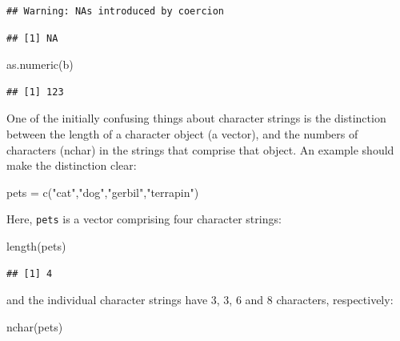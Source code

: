 \documentclass[
]{book}
\newenvironment{Shaded}{\begin{snugshade}}{\end{snugshade}}
\newcommand{\FunctionTok}[1]{\textcolor[rgb]{0.00,0.00,0.00}{#1}}
\newcommand{\NormalTok}[1]{#1}
\newcommand{\OtherTok}[1]{\textcolor[rgb]{0.56,0.35,0.01}{#1}}
\newcommand{\StringTok}[1]{\textcolor[rgb]{0.31,0.60,0.02}{#1}}
\begin{document}
\begin{verbatim}
## Warning: NAs introduced by coercion
\end{verbatim}

\begin{verbatim}
## [1] NA
\end{verbatim}

\begin{Shaded}
\begin{Highlighting}[]
\FunctionTok{as.numeric}\NormalTok{(b)}
\end{Highlighting}
\end{Shaded}

\begin{verbatim}
## [1] 123
\end{verbatim}

One of the initially confusing things about character strings is the distinction between the length of a character object (a vector), and the numbers of characters (nchar) in the strings that comprise that object.
An example should make the distinction clear:

\begin{Shaded}
\begin{Highlighting}[]
\NormalTok{pets }\OtherTok{=} \FunctionTok{c}\NormalTok{(}\StringTok{"cat"}\NormalTok{,}\StringTok{"dog"}\NormalTok{,}\StringTok{"gerbil"}\NormalTok{,}\StringTok{"terrapin"}\NormalTok{)}
\end{Highlighting}
\end{Shaded}

Here, \texttt{pets} is a vector comprising four character strings:

\begin{Shaded}
\begin{Highlighting}[]
\FunctionTok{length}\NormalTok{(pets)}
\end{Highlighting}
\end{Shaded}

\begin{verbatim}
## [1] 4
\end{verbatim}

and the individual character strings have 3, 3, 6 and 8 characters, respectively:

\begin{Shaded}
\begin{Highlighting}[]
\FunctionTok{nchar}\NormalTok{(pets)}
\end{Highlighting}
\end{Shaded}
\end{document}
